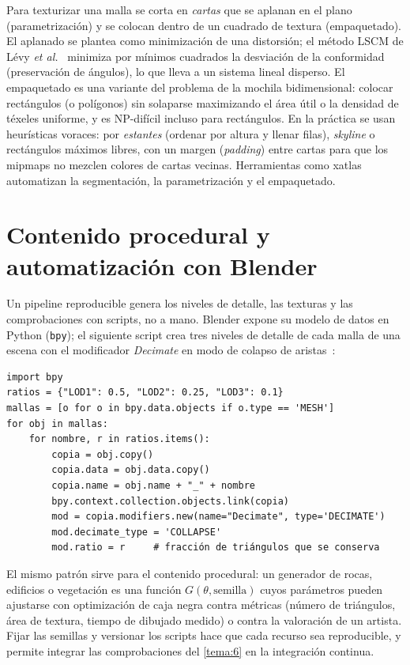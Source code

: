 Para texturizar una malla se corta en \emph{cartas} que se aplanan en el plano (parametrización) y se colocan dentro de un cuadrado de textura (empaquetado). El aplanado se plantea como minimización de una distorsión; el método LSCM de Lévy \emph{et al.}~\cite{lscm} minimiza por mínimos cuadrados la desviación de la conformidad (preservación de ángulos), lo que lleva a un sistema lineal disperso. El empaquetado es una variante del problema de la mochila bidimensional: colocar rectángulos (o polígonos) sin solaparse maximizando el área útil o la densidad de téxeles uniforme, y es NP-difícil incluso para rectángulos. En la práctica se usan heurísticas voraces: por \emph{estantes} (ordenar por altura y llenar filas), \emph{skyline} o rectángulos máximos libres, con un margen (\emph{padding}) entre cartas para que los mipmaps no mezclen colores de cartas vecinas. Herramientas como xatlas automatizan la segmentación, la parametrización y el empaquetado.

\section{Contenido procedural y automatización con Blender}

Un pipeline reproducible genera los niveles de detalle, las texturas y las comprobaciones con scripts, no a mano. Blender expone su modelo de datos en Python (\texttt{bpy}); el siguiente script crea tres niveles de detalle de cada malla de una escena con el modificador \emph{Decimate} en modo de colapso de aristas~\cite{blenderapi}:

\begin{center}
\begin{minipage}{0.92\textwidth}
\small
\begin{verbatim}
import bpy
ratios = {"LOD1": 0.5, "LOD2": 0.25, "LOD3": 0.1}
mallas = [o for o in bpy.data.objects if o.type == 'MESH']
for obj in mallas:
    for nombre, r in ratios.items():
        copia = obj.copy()
        copia.data = obj.data.copy()
        copia.name = obj.name + "_" + nombre
        bpy.context.collection.objects.link(copia)
        mod = copia.modifiers.new(name="Decimate", type='DECIMATE')
        mod.decimate_type = 'COLLAPSE'
        mod.ratio = r     # fracción de triángulos que se conserva
\end{verbatim}
\end{minipage}
\end{center}

El mismo patrón sirve para el contenido procedural: un generador de rocas, edificios o vegetación es una función $G(\theta,\text{semilla})$ cuyos parámetros pueden ajustarse con optimización de caja negra contra métricas (número de triángulos, área de textura, tiempo de dibujado medido) o contra la valoración de un artista. Fijar las semillas y versionar los scripts hace que cada recurso sea reproducible, y permite integrar las comprobaciones del \cref{tema:6} en la integración continua.

